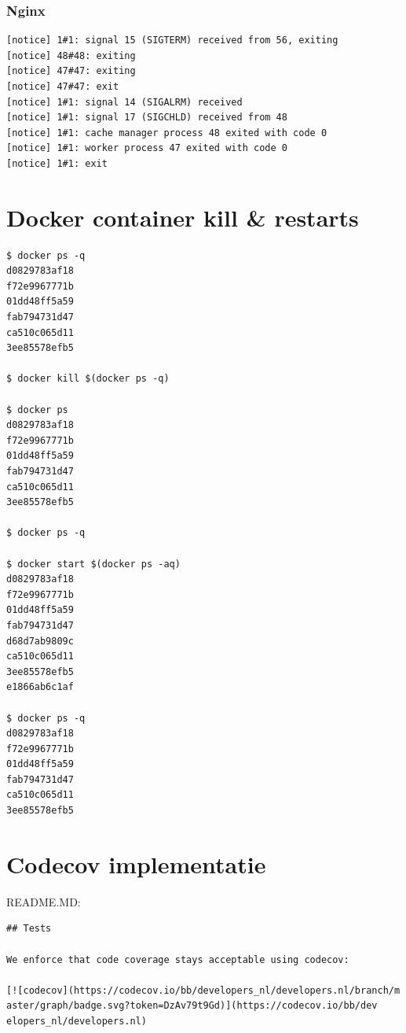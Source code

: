 \subsubsection{Nginx}
\begin{verbatim}
[notice] 1#1: signal 15 (SIGTERM) received from 56, exiting
[notice] 48#48: exiting
[notice] 47#47: exiting
[notice] 47#47: exit
[notice] 1#1: signal 14 (SIGALRM) received
[notice] 1#1: signal 17 (SIGCHLD) received from 48
[notice] 1#1: cache manager process 48 exited with code 0
[notice] 1#1: worker process 47 exited with code 0
[notice] 1#1: exit
\end{verbatim}

\section{Docker container kill \& restarts}

\label{DockerKills}

\begin{verbatim}
$ docker ps -q
d0829783af18
f72e9967771b
01dd48ff5a59
fab794731d47
ca510c065d11
3ee85578efb5

$ docker kill $(docker ps -q) 

$ docker ps
d0829783af18
f72e9967771b
01dd48ff5a59
fab794731d47
ca510c065d11
3ee85578efb5

$ docker ps -q

$ docker start $(docker ps -aq)
d0829783af18
f72e9967771b
01dd48ff5a59
fab794731d47
d68d7ab9809c
ca510c065d11
3ee85578efb5
e1866ab6c1af

$ docker ps -q
d0829783af18
f72e9967771b
01dd48ff5a59
fab794731d47
ca510c065d11
3ee85578efb5
\end{verbatim}

\section{Codecov implementatie} \label{codecov}
README.MD:
\begin{verbatim}
## Tests

We enforce that code coverage stays acceptable using codecov:

[![codecov](https://codecov.io/bb/developers_nl/developers.nl/branch/m aster/graph/badge.svg?token=DzAv79t9Gd)](https://codecov.io/bb/dev elopers_nl/developers.nl)
\end{verbatim}

